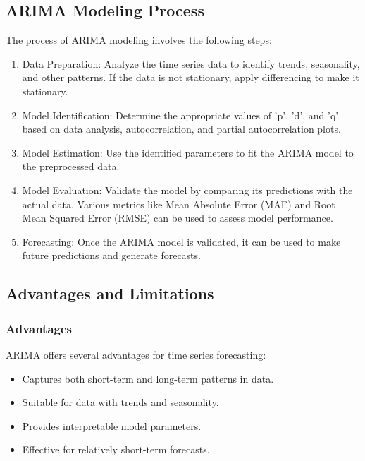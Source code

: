 \documentclass{article}
\begin{document}
\subsection{ARIMA Modeling Process}

The process of ARIMA modeling involves the following steps:

\begin{enumerate}
    \item Data Preparation: Analyze the time series data to identify trends, seasonality, and other patterns. If the data is not stationary, apply differencing to make it stationary.
    
    \item Model Identification: Determine the appropriate values of 'p', 'd', and 'q' based on data analysis, autocorrelation, and partial autocorrelation plots.
    
    \item Model Estimation: Use the identified parameters to fit the ARIMA model to the preprocessed data.
    
    \item Model Evaluation: Validate the model by comparing its predictions with the actual data. Various metrics like Mean Absolute Error (MAE) and Root Mean Squared Error (RMSE) can be used to assess model performance.
    
    \item Forecasting: Once the ARIMA model is validated, it can be used to make future predictions and generate forecasts.
\end{enumerate}

\subsection{Advantages and Limitations}

\subsubsection{Advantages}
ARIMA offers several advantages for time series forecasting:

\begin{itemize}
    \item Captures both short-term and long-term patterns in data.
    \item Suitable for data with trends and seasonality.
    \item Provides interpretable model parameters.
    \item Effective for relatively short-term forecasts.
\end{itemize}
\end{document}
